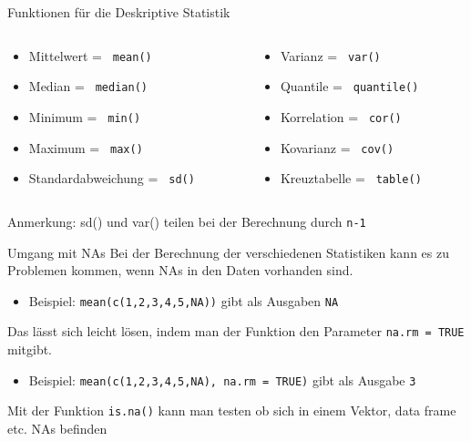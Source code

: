 \documentclass[xcolor=dvipsnames, aspectratio = 169]{beamer}
\begin{document}
\begin{frame}[fragile]{Funktionen für die Deskriptive Statistik}
\begin{columns}[T]
	\begin{column}{0.5\textwidth}
		\begin{itemize}
			\item Mittelwert = \verb+ mean() +
			\item Median = \verb+ median() +
			\item Minimum = \verb+ min() +
			\item Maximum = \verb+ max() +
			\item Standardabweichung = \verb+ sd() +
		\end{itemize}
	\end{column}
	\begin{column}{0.5\textwidth}
		\begin{itemize}
			\item Varianz = \verb+ var() +
			\item Quantile = \verb+ quantile() +
			\item Korrelation = \verb+ cor() +
			\item Kovarianz = \verb+ cov() +
			\item Kreuztabelle = \verb+ table() +
		\end{itemize}
	\end{column}
\end{columns}
Anmerkung: sd() und var() teilen bei der Berechnung durch \verb+n-1+
\end{frame}

\begin{frame}[fragile]{Umgang mit NAs}
	Bei der Berechnung der verschiedenen Statistiken kann es zu Problemen kommen, wenn NAs in den Daten vorhanden sind.\\
	\begin{itemize}
			\item Beispiel: \verb+mean(c(1,2,3,4,5,NA))+ gibt als Ausgaben \verb+NA+\\
	\end{itemize}
	Das lässt sich leicht lösen, indem man der Funktion den Parameter \verb+na.rm = TRUE+ mitgibt.\\
	\begin{itemize}
			\item Beispiel: \verb+mean(c(1,2,3,4,5,NA), na.rm = TRUE)+ gibt als Ausgabe \verb+3+
	\end{itemize}
	Mit der Funktion \verb+is.na()+ kann man testen ob sich in einem Vektor, data frame etc. NAs befinden
\end{frame}
\end{document}
